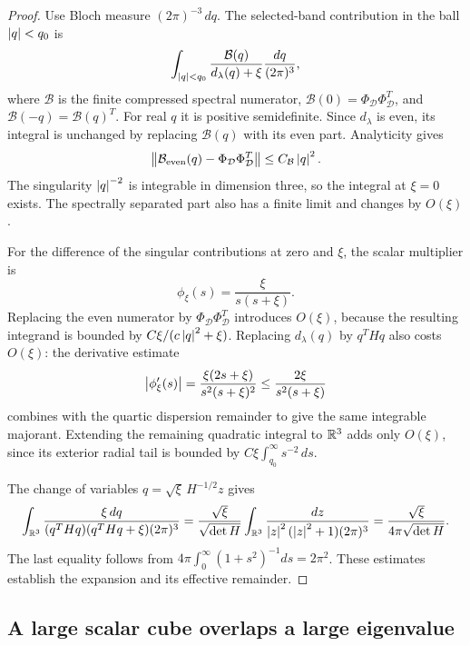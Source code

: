 \begin{proof}
Use Bloch measure \((2\pi)^{-3}\,dq\). The selected-band contribution in
the ball \(\left\lvert q\right\rvert<q_0\) is
\[
 \int_{\left\lvert q\right\rvert<q_0}\frac{\mathcal B(q)}{d_\lambda(q)+\xi}
                    \frac{dq}{(2\pi)^3},
\]
where \(\mathcal B\) is the finite compressed spectral numerator,
\(\mathcal B(0)=\Phi_{\mathcal D}\Phi_{\mathcal D}^T\), and
\(\mathcal B(-q)=\mathcal B(q)^T\). For real \(q\) it is positive
semidefinite. Since \(d_\lambda\) is even, its integral is unchanged by replacing
\(\mathcal B(q)\) with its even part. Analyticity gives
\[
 \left\lVert \mathcal B_{\mathrm{even}}(q)-\Phi_{\mathcal D}\Phi_{\mathcal D}^T\right\rVert
 \le C_{\mathcal B}\left\lvert q\right\rvert^2.
\]
The singularity \(\left\lvert q\right\rvert^{-2}\) is integrable in dimension three, so
the integral at \(\xi=0\) exists. The spectrally separated part also has
a finite limit and changes by \(O(\xi)\).

For the difference of the singular contributions at zero and \(\xi\),
the scalar multiplier is
\[
 \phi_\xi(s)=\frac{\xi}{s(s+\xi)}.
\]
Replacing the even numerator by \(\Phi_{\mathcal D}\Phi_{\mathcal D}^T\) introduces \(O(\xi)\), because
the resulting integrand is bounded by
\(C\xi/(c\left\lvert q\right\rvert^2+\xi)\). Replacing \(d_\lambda(q)\) by \(q^THq\) also costs
\(O(\xi)\): the derivative estimate
\[
 \left\lvert \phi_\xi'(s)\right\rvert
   =\frac{\xi(2s+\xi)}{s^2(s+\xi)^2}
   \le\frac{2\xi}{s^2(s+\xi)}
\]
combines with the quartic dispersion remainder to give the same integrable
majorant. Extending the remaining quadratic integral to \(\mathbb R^3\) adds
only \(O(\xi)\), since its exterior radial tail is bounded by
\(C\xi\int_{q_0}^{\infty}s^{-2}\,ds\).

The change of variables \(q=\sqrt{\xi}\,H^{-1/2}z\) gives
\[
 \int_{\mathbb R^3}\frac{\xi\,dq}
 {(q^THq)(q^THq+\xi)(2\pi)^3}
 =
 \frac{\sqrt{\xi}}{\sqrt{\det H}}
 \int_{\mathbb R^3}\frac{dz}{\left\lvert z\right\rvert^2(\left\lvert z\right\rvert^2+1)(2\pi)^3}
 =
 \frac{\sqrt{\xi}}{4\pi\sqrt{\det H}}.
\]
The last equality follows from
\(4\pi\int_0^\infty(1+s^2)^{-1}ds=2\pi^2\).
These estimates establish the expansion and its effective remainder.
\end{proof}

\subsection{A large scalar cube overlaps a large eigenvalue}

